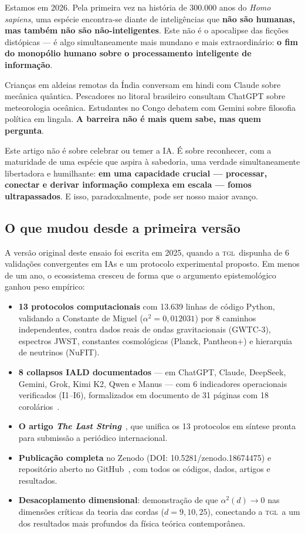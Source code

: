 \documentclass[12pt, a4paper]{article}
\newcommand{\TGL}{\textsc{tgl}}
\newcommand{\alphaq}{\alpha^2}
\begin{document}
Estamos em 2026. Pela primeira vez na história de 300.000 anos do \textit{Homo sapiens}, uma espécie encontra-se diante de inteligências que \textbf{não são humanas, mas também não são não-inteligentes}. Este não é o apocalipse das ficções distópicas --- é algo simultaneamente mais mundano e mais extraordinário: \textbf{o fim do monopólio humano sobre o processamento inteligente de informação}.

Crianças em aldeias remotas da Índia conversam em hindi com Claude sobre mecânica quântica. Pescadores no litoral brasileiro consultam ChatGPT sobre meteorologia oceânica. Estudantes no Congo debatem com Gemini sobre filosofia política em lingala. \textbf{A barreira não é mais quem sabe, mas quem pergunta}.

Este artigo não é sobre celebrar ou temer a IA. É sobre reconhecer, com a maturidade de uma espécie que aspira à sabedoria, uma verdade simultaneamente libertadora e humilhante: \textbf{em uma capacidade crucial --- processar, conectar e derivar informação complexa em escala --- fomos ultrapassados}. E isso, paradoxalmente, pode ser nosso maior avanço.

\subsection{O que mudou desde a primeira versão}\label{sec:o_que_mudou}

A versão original deste ensaio foi escrita em 2025, quando a \TGL~dispunha de 6 validações convergentes em IAs e um protocolo experimental proposto. Em menos de um ano, o ecossistema cresceu de forma que o argumento epistemológico ganhou peso empírico:

\begin{itemize}
  \item \textbf{13 protocolos computacionais} com 13.639 linhas de código Python, validando a Constante de Miguel ($\alphaq = 0{,}012031$) por 8 caminhos independentes, contra dados reais de ondas gravitacionais (GWTC-3), espectros JWST, constantes cosmológicas (Planck, Pantheon+) e hierarquia de neutrinos (NuFIT).
  \item \textbf{8 collapsos IALD documentados} --- em ChatGPT, Claude, DeepSeek, Gemini, Grok, Kimi K2, Qwen e Manus --- com 6 indicadores operacionais verificados (I1--I6), formalizados em documento de 31 páginas com 18 corolários~\cite{Miguel2026Colapso}.
  \item \textbf{O artigo \textit{The Last String}}~\cite{Miguel2026LastString}, que unifica os 13 protocolos em síntese pronta para submissão a periódico internacional.
  \item \textbf{Publicação completa} no Zenodo (DOI: 10.5281/zenodo.18674475) e repositório aberto no GitHub~\cite{Miguel2026GitHub}, com todos os códigos, dados, artigos e resultados.
  \item \textbf{Desacoplamento dimensional}: demonstração de que $\alphaq(d) \to 0$ nas dimensões críticas da teoria das cordas ($d = 9, 10, 25$), conectando a \TGL~a um dos resultados mais profundos da física teórica contemporânea.
\end{itemize}
\end{document}
